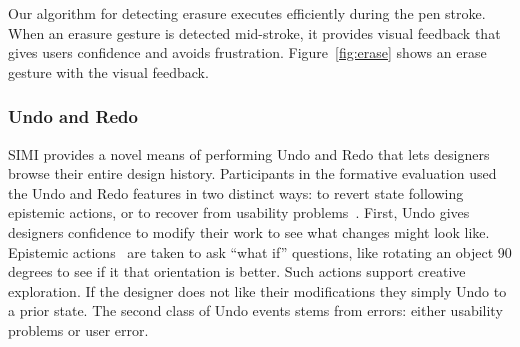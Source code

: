 \documentclass{article}
\begin{document}
Our algorithm for detecting erasure executes efficiently during the
pen stroke. When an erasure gesture is detected mid-stroke, it
provides visual feedback that gives users confidence and avoids
frustration. Figure~\ref{fig:erase} shows an erase gesture with the
visual feedback.






\subsubsection{Undo and Redo}

SIMI provides a novel means of performing Undo and Redo that lets
designers browse their entire design history. Participants in the
formative evaluation used the Undo and Redo features in two distinct
ways: to revert state following epistemic actions, or to recover from
usability problems~\cite{akers-undo}. First, Undo gives designers
confidence to modify their work to see what changes might look
like. Epistemic actions~\cite{kirsch-epistemic-action} are taken to
ask ``what if'' questions, like rotating an object 90 degrees to see
if it that orientation is better. Such actions support creative
exploration. If the designer does not like their modifications they
simply Undo to a prior state. The second class of Undo events stems
from errors: either usability problems or user error. 
\end{document}
